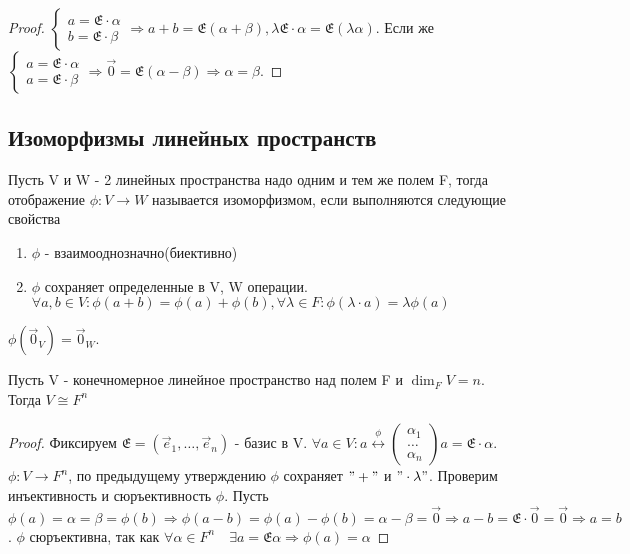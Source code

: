 \begin{proof}
	\(\left\{\begin{gathered}
		a = \mathfrak{E}\cdot \alpha \\
		b = \mathfrak{E}\cdot \beta
	\end{gathered}\right. \Longrightarrow a + b =\mathfrak{E}(\alpha+\beta), \lambda\mathfrak{E}\cdot\alpha = \mathfrak{E}(\lambda\alpha)\). Если же \(\left\{\begin{gathered}
	a = \mathfrak{E}\cdot\alpha \\
	a = \mathfrak{E}\cdot\beta
	\end{gathered}\right. \Longrightarrow \vec 0 = \mathfrak{E}(\alpha - \beta) \Longrightarrow \alpha = \beta\).
\end{proof}
\subsection{Изоморфизмы линейных пространств}
\begin{definition}
	Пусть V и W - 2 линейных пространства надо одним и тем же полем F, тогда отображение \(\phi:V\to W\) называется изоморфизмом, если выполняются следующие свойства 
	\begin{enumerate}
	 \item $\phi$ - взаимооднозначно(биективно)
	 \item $\phi$ сохраняет определенные в V, W операции. \(\forall a,b\in V:\phi(a+b)=\phi(a)+\phi(b), \forall \lambda\in F: \phi(\lambda\cdot a) = \lambda\phi(a)\)
	\end{enumerate}
\end{definition}
\begin{note}
		\(\phi(\vec 0_V) = \vec 0_W\).
\end{note}
\begin{theorem}
	Пусть V - конечномерное линейное пространство над полем F и \(\dim_FV = n\). Тогда \(V\cong F^n\)
\end{theorem}
\begin{proof}
	Фиксируем \(\mathfrak{E} = (\vec e_1, \ldots, \vec e_n)\) - базис в V. \(\forall a\in V: a\overset{\phi}{\longleftrightarrow}\begin{pmatrix}
		\alpha_1 \\ \ldots \\ \alpha_n
	\end{pmatrix} a = \mathfrak{E}\cdot\alpha\).   \(\phi: V\to F^n\), по предыдущему утверждению $\phi$ сохраняет \("+"\) и \("\cdot\lambda"\). 
	Проверим инъективность и сюръективность $\phi$. Пусть \(\phi(a)=\alpha=\beta = \phi(b) \Longrightarrow \phi(a-b) = \phi(a) - \phi(b) = \alpha - \beta = \vec 0 \Longrightarrow a - b = \mathfrak{E}\cdot\vec 0 = \vec 0\Longrightarrow a = b\).
	 $\phi$ сюръективна, так как \(\forall \alpha\in F^n \quad \exists a = \mathfrak{E}\alpha\Longrightarrow \phi(a) = \alpha\)
\end{proof}
